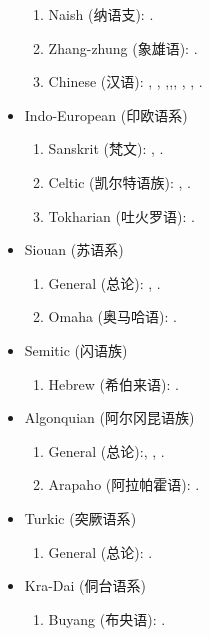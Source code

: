 \documentclass[oneside,a4paper,11pt]{article}
\newcommand{\zh}[1]{{\cn #1}}
\newcommand{\lingua}[3]{#1 (\zh{#3})}
\begin{document}
\begin{itemize}
\begin{enumerate}
\item \lingua{Naish}{Naish}{纳语支}: \cite{jacques.michaud11naish}.
\item  \lingua{Zhang-zhung}{Zhang-zhung}{象雄语}: \cite{jacques09zz}.
\item \lingua{Chinese}{Chinois}{汉语}:  \cite{jacques00ywij},  \cite{jacques03dissimilation},   \cite{jacques14honey},\cite{jacques15sr},\cite{jacques17genetic}, \cite{jacques17traditional}, \cite{jacques17buyang}, \cite{jacques16ssuffixes}.
\end{enumerate}
\item \lingua{Indo-European}{Indo-européen}{印欧语系}
\begin{enumerate}
\item \lingua{Sanskrit}{Sanskrit}{梵文}: \cite{jacques13vama}, \cite{jacques16camara}.
\item \lingua{Celtic}{Celtique}{凯尔特语族}: \cite{michaud-jacques12nasalite}, \cite{jacques15cochon}.
\item \lingua{Tokharian}{Tocharien}{吐火罗语}: \cite{jacques14honey}.
\end{enumerate}
\item \lingua{Siouan}{Sioux}{苏语系}
\begin{enumerate}
\item \lingua{General}{Général}{总论}: \cite{jacques12bear}, \cite{michaud-jacques12nasalite}.  
\item \lingua{Omaha}{Omaha}{奥马哈语}: \cite{jacques16ebde}.
\end{enumerate}
\item \lingua{Semitic}{Sémitique}{闪语族}
\begin{enumerate}
\item \lingua{Hebrew}{Hébreu}{希伯来语}: \cite{rg-gj12yod}.
\end{enumerate}
\item \lingua{Algonquian}{Algonquien}{阿尔冈昆语族}
\begin{enumerate}
\item \lingua{General}{Général}{总论}:\cite{jacques12bear}, \cite{jacques14inverse}, \cite{jacques17directionality}.
\item \lingua{Arapaho}{Arapaho}{阿拉帕霍语}: \cite{jacques13arapaho}.
\end{enumerate}
\item  \lingua{Turkic}{Turcique}{突厥语系}
\begin{enumerate}
\item \lingua{General}{Général}{总论}: \cite{antonov12kumush}.
\end{enumerate}
\item \lingua{Kra-Dai}{Kra-Dai}{侗台语系}
\begin{enumerate}
\item \lingua{Buyang}{Buyang}{布央语}: \cite{jacques17buyang}.
\end{enumerate}
\end{itemize}  
\end{document}
